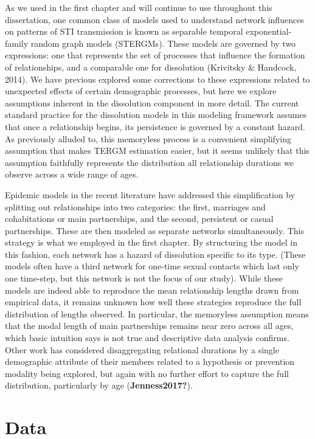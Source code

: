 \documentclass [11pt, proquest] {uwthesis}[2015/03/03]
\begin{document}
As we used in the first chapter and will continue to use throughout this dissertation, one common class of models used to understand network influences on patterns of STI transmission is known as separable temporal exponential-family random graph models (STERGMs). These models are governed by two expressions: one that represents the set of processes that influence the formation of relationships, and a comparable one for dissolution (Krivitsky \& Handcock, 2014). We have previous explored some corrections to these expressions related to unexpected effects of certain demographic processes, but here we explore assumptions inherent in the dissolution component in more detail. The current standard practice for the dissolution models in this modeling framework assumes that once a relationship begins, its persistence is governed by a constant hazard. As previously alluded to, this memoryless process is a convenient simplifying assumption that makes TERGM estimation easier, but it seems unlikely that this assumption faithfully represents the distribution all relationship durations we observe across a wide range of ages.

Epidemic models in the recent literature have addressed this simplification by splitting out relationships into two categories: the first, marriages and cohabitations or main partnerships, and the second, persistent or casual partnerships. These are then modeled as separate networks simultaneously. This strategy is what we employed in the first chapter. By structuring the model in this fashion, each network has a hazard of dissolution specific to its type. (These models often have a third network for one-time sexual contacts which last only one time-step, but this network is not the focus of our study). While these models are indeed able to reproduce the mean relationship lengths drawn from empirical data, it remains unknown how well these strategies reproduce the full distribution of lengths observed. In particular, the memoryless assumption means that the modal length of main partnerships remains near zero across all ages, which basic intuition says is not true and descriptive data analysis confirms. Other work has considered disaggregating relational durations by a single demographic attribute of their members related to a hypothesis or prevention modality being explored, but again with no further effort to capture the full distribution, particularly by age (\textbf{Jenness2017?}).

\hypertarget{data}{%
\section{Data}\label{data}}
\end{document}
